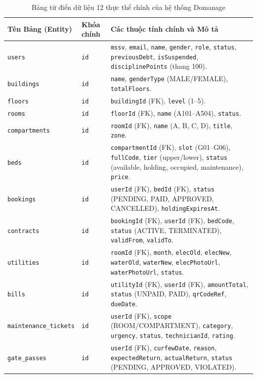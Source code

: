 \begin{table}[htbp]
\centering
\caption{Bảng từ điển dữ liệu 12 thực thể chính của hệ thống Domanage}
\label{tab:database_schema}
\small
\begin{tabularx}{\textwidth}{|l|l|X|}
\hline
\rowcolor{blue!10}
\textbf{Tên Bảng (Entity)} & \textbf{Khóa chính} & \textbf{Các thuộc tính chính và Mô tả} \\ \hline
\texttt{users} & \texttt{id} & \texttt{mssv}, \texttt{email}, \texttt{name}, \texttt{gender}, \texttt{role}, \texttt{status}, \texttt{previousDebt}, \texttt{isSuspended}, \texttt{disciplinePoints} (thang 100). \\ \hline
\texttt{buildings} & \texttt{id} & \texttt{name}, \texttt{genderType} (MALE/FEMALE), \texttt{totalFloors}. \\ \hline
\texttt{floors} & \texttt{id} & \texttt{buildingId} (FK), \texttt{level} (1--5). \\ \hline
\texttt{rooms} & \texttt{id} & \texttt{floorId} (FK), \texttt{name} (A101--A504), \texttt{status}. \\ \hline
\texttt{compartments} & \texttt{id} & \texttt{roomId} (FK), \texttt{name} (A, B, C, D), \texttt{title}, \texttt{zone}. \\ \hline
\texttt{beds} & \texttt{id} & \texttt{compartmentId} (FK), \texttt{slot} (G01--G06), \texttt{fullCode}, \texttt{tier} (upper/lower), \texttt{status} (available, holding, occupied, maintenance), \texttt{price}. \\ \hline
\texttt{bookings} & \texttt{id} & \texttt{userId} (FK), \texttt{bedId} (FK), \texttt{status} (PENDING, PAID, APPROVED, CANCELLED), \texttt{holdingExpiresAt}. \\ \hline
\texttt{contracts} & \texttt{id} & \texttt{bookingId} (FK), \texttt{userId} (FK), \texttt{bedCode}, \texttt{status} (ACTIVE, TERMINATED), \texttt{validFrom}, \texttt{validTo}. \\ \hline
\texttt{utilities} & \texttt{id} & \texttt{roomId} (FK), \texttt{month}, \texttt{elecOld}, \texttt{elecNew}, \texttt{waterOld}, \texttt{waterNew}, \texttt{elecPhotoUrl}, \texttt{waterPhotoUrl}, \texttt{status}. \\ \hline
\texttt{bills} & \texttt{id} & \texttt{utilityId} (FK), \texttt{userId} (FK), \texttt{amountTotal}, \texttt{status} (UNPAID, PAID), \texttt{qrCodeRef}, \texttt{dueDate}. \\ \hline
\texttt{maintenance\_tickets} & \texttt{id} & \texttt{userId} (FK), \texttt{scope} (ROOM/COMPARTMENT), \texttt{category}, \texttt{urgency}, \texttt{status}, \texttt{technicianId}, \texttt{rating}. \\ \hline
\texttt{gate\_passes} & \texttt{id} & \texttt{userId} (FK), \texttt{curfewDate}, \texttt{reason}, \texttt{expectedReturn}, \texttt{actualReturn}, \texttt{status} (PENDING, APPROVED, VIOLATED). \\ \hline
\end{tabularx}
\end{table}

